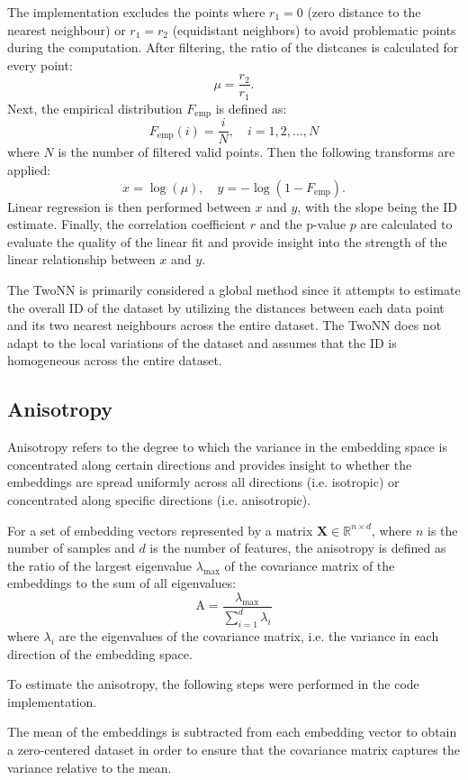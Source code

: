 \documentclass[
  11pt,
  a4paper,
  onecolumn]{article}
\begin{document}
The implementation excludes the points where $r_1 = 0$ (zero distance to the nearest neighbour) or $r_1 = r_2$ (equidistant neighbors) to avoid problematic points during the computation. After filtering, the ratio of the distcanes is calculated for every point:
\[ 
\mu = \frac{r_2}{r_1} . 
\]
Next, the empirical distribution $F_{\text{emp}}$ is defined as:
\[
F_{\text{emp}}(i) = \frac{i}{N}, \quad i = 1, 2, \ldots, N
\]
where $ N $ is the number of filtered valid points. Then the following transforms are applied:
\[
x = \log(\mu), \quad y = -\log(1 - F_{\text{emp}}).
\]
Linear regression is then performed between $x$ and $y$, with the slope being the ID estimate.  Finally, the correlation coefficient $r$ and the p-value $p$ are calculated to evaluate the quality of the linear fit and provide insight into the strength of the linear relationship between $x$ and $y$.

The TwoNN is primarily considered a global method since it attempts to estimate the overall ID of the dataset by utilizing the distances between each data point and its two nearest neighbours across the entire dataset. The TwoNN does not adapt to the local variations of the dataset and assumes that the ID is homogeneous across the entire dataset. 


\subsection{Anisotropy}
Anisotropy refers to the degree to which the variance in the embedding space is concentrated along certain directions and provides insight to whether the embeddings are spread uniformly across all directions (i.e. isotropic) or concentrated along specific directions (i.e. anisotropic). 

For a set of embedding vectors represented by a matrix $\mathbf{X} \in \mathbb{R}^{n \times d}$, where $n$ is the number of samples and $d$ is the number of features, the anisotropy is defined as the ratio of the largest eigenvalue $\lambda_{\text{max}}$ of the covariance matrix of the embeddings to the sum of all eigenvalues:
\[
\text{A} = \frac{\lambda_{\text{max}}}{\sum_{i=1}^{d} \lambda_i}
\]
where $ \lambda_i $ are the eigenvalues of the covariance matrix, i.e. the variance in each direction of the embedding space.

To estimate the anisotropy, the following steps were performed in the code implementation.

The mean of the embeddings is subtracted from each embedding vector to obtain a zero-centered dataset in order to ensure that the covariance matrix captures the variance relative to the mean.
\end{document}
